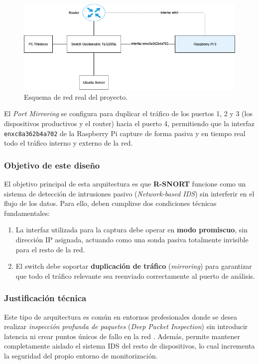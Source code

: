 \documentclass[11pt,a4paper,twoside]{report}
\begin{document}
\begin{figure}[H]
	\centering
	\includegraphics[scale=0.6]{script_automatico/network.png}
	\caption{Esquema de red real del proyecto.}
\end{figure}

El \textit{Port Mirroring} se configura para duplicar el tráfico de los puertos 1, 2 y 3 (los dispositivos productivos y el router) hacia el puerto 4, permitiendo que la interfaz \texttt{enxc8a362b4a702} de la Raspberry Pi capture de forma pasiva y en tiempo real todo el tráfico interno y externo de la red.

\subsubsection{Objetivo de este diseño}

El objetivo principal de esta arquitectura es que \textbf{R-SNORT} funcione como un sistema de detección de intrusiones pasivo (\textit{Network-based IDS}) sin interferir en el flujo de los datos. Para ello, deben cumplirse dos condiciones técnicas fundamentales:

\begin{enumerate}
	\item La interfaz utilizada para la captura debe operar en \textbf{modo promiscuo}, sin dirección IP asignada, actuando como una sonda pasiva totalmente invisible para el resto de la red.
	\item El switch debe soportar \textbf{duplicación de tráfico} (\textit{mirroring}) para garantizar que todo el tráfico relevante sea reenviado correctamente al puerto de análisis.
\end{enumerate}

\subsubsection{Justificación técnica}

Este tipo de arquitectura es común en entornos profesionales donde se desea realizar \textit{inspección profunda de paquetes} (\textit{Deep Packet Inspection}) sin introducir latencia ni crear puntos únicos de fallo en la red \cite{song2020dpi}. Además, permite mantener completamente aislado el sistema IDS del resto de dispositivos, lo cual incrementa la seguridad del propio entorno de monitorización.\newline
\end{document}
